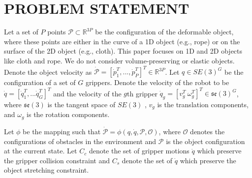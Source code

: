 





\section{PROBLEM STATEMENT}
\label{sec:problemstatement}
Let a set of $P$ points $\mathcal{P}\subset \mathbb{R}^{3P}$ be the configuration of the deformable object, where these points are either in the curve of a 1D object (e.g., rope) or on the surface of the 2D object (e.g., cloth). 
This paper focuses on 1D and 2D objects like cloth and rope. We do not consider volume-preserving or elastic objects.
Denote the object velocity as $\dot{\mathcal{P}} = [\dot{p}_1^T,..., \dot{p}_P^T]^T \in \mathbb{R}^{3P}$.
Let $q\in SE(3)^G$ be the configuration of a set of $G$ grippers. 
Denote the velocity of the robot to be $\dot{q} = [\dot{q}_1^T, ... \dot{q}_G^T]^T$ and the velocity of the $g$th gripper $\dot{q}_g = [v_g^T \ \omega_g^T]^T \in \mathfrak{se}(3)^G$, 
where $\mathfrak{se}(3)$ is the tangent space of $SE(3)$ \cite{Murray1994}, 
$v_g$ is the translation components, and $\omega_g$ is the rotation components. 

Let $\phi$ be the mapping such that $\dot{\mathcal{P}} = \phi (q,\dot{q},\mathcal{P},\mathcal{O})$, where $\mathcal{O}$ denotes the configurations of obstacles in the environment and $\mathcal{P}$ is the object configuration at the current state.
Let $C_c$ denote the set of gripper motions $\dot{q}$ which preserve the gripper collision constraint and $C_s$ denote the set of $\dot{q}$ which preserve the object stretching constraint.

